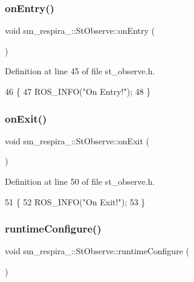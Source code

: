 \subsubsection{\texorpdfstring{on\+Entry()}{onEntry()}}
{\footnotesize\ttfamily void sm\+\_\+respira\+\_\+::\+St\+Observe\+::on\+Entry (\begin{DoxyParamCaption}{ }\end{DoxyParamCaption})\hspace{0.3cm}{\ttfamily [inline]}}



Definition at line 45 of file st\+\_\+observe.\+h.


\begin{DoxyCode}
46     \{
47         ROS\_INFO(\textcolor{stringliteral}{"On Entry!"});
48     \}
\end{DoxyCode}
\mbox{\label{structsm__respira__1_1_1StObserve_a1491b333b722854794cc61e55ff7015a}} 
\subsubsection{\texorpdfstring{on\+Exit()}{onExit()}}
{\footnotesize\ttfamily void sm\+\_\+respira\+\_\+::\+St\+Observe\+::on\+Exit (\begin{DoxyParamCaption}{ }\end{DoxyParamCaption})\hspace{0.3cm}{\ttfamily [inline]}}



Definition at line 50 of file st\+\_\+observe.\+h.


\begin{DoxyCode}
51     \{
52         ROS\_INFO(\textcolor{stringliteral}{"On Exit!"});
53     \}
\end{DoxyCode}
\mbox{\label{structsm__respira__1_1_1StObserve_a3c1fe027b9396233475e8bd94fed6df7}} 
\subsubsection{\texorpdfstring{runtime\+Configure()}{runtimeConfigure()}}
{\footnotesize\ttfamily void sm\+\_\+respira\+\_\+::\+St\+Observe\+::runtime\+Configure (\begin{DoxyParamCaption}{ }\end{DoxyParamCaption})\hspace{0.3cm}{\ttfamily [inline]}}



